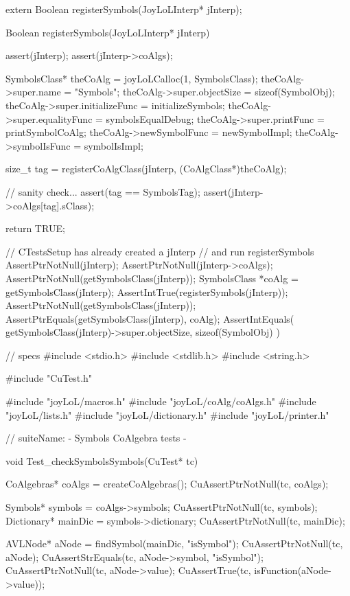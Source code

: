 \startCHeader
extern Boolean registerSymbols(JoyLoLInterp* jInterp);
\stopCHeader
{}

\startCCode
Boolean registerSymbols(JoyLoLInterp* jInterp) {
  assert(jInterp);
  assert(jInterp->coAlgs);
  
  SymbolsClass* theCoAlg = joyLoLCalloc(1, SymbolsClass);
  theCoAlg->super.name           = "Symbols";
  theCoAlg->super.objectSize     = sizeof(SymbolObj);
  theCoAlg->super.initializeFunc = initializeSymbols;
  theCoAlg->super.equalityFunc   = symbolsEqualDebug;
  theCoAlg->super.printFunc      = printSymbolCoAlg;
  theCoAlg->newSymbolFunc        = newSymbolImpl;
  theCoAlg->symbolIsFunc         = symbolIsImpl;

  size_t tag =
    registerCoAlgClass(jInterp, (CoAlgClass*)theCoAlg);
  
  // sanity check...
  assert(tag == SymbolsTag);
  assert(jInterp->coAlgs[tag].sClass);

  return TRUE;
}
\stopCCode


\startCTest
  // CTestsSetup has already created a jInterp
  // and run registerSymbols
  AssertPtrNotNull(jInterp);
  AssertPtrNotNull(jInterp->coAlgs);
  AssertPtrNotNull(getSymbolsClass(jInterp));
  SymbolsClass *coAlg = getSymbolsClass(jInterp);
  AssertIntTrue(registerSymbols(jInterp));
  AssertPtrNotNull(getSymbolsClass(jInterp));
  AssertPtrEquals(getSymbolsClass(jInterp), coAlg);
  AssertIntEquals(
    getSymbolsClass(jInterp)->super.objectSize,
    sizeof(SymbolObj)
  )
\stopCTest
\stopTestCase
\stopTestSuite


\starttyping
// specs
#include <stdio.h>
#include <stdlib.h>
#include <string.h>

#include "CuTest.h"

#include "joyLoL/macros.h"
#include "joyLoL/coAlg/coAlgs.h"
#include "joyLoL/lists.h"
#include "joyLoL/dictionary.h"
#include "joyLoL/printer.h"

// suiteName: - Symbols CoAlgebra tests -

void Test_checkSymbolsSymbols(CuTest* tc) {
  CoAlgebras* coAlgs = createCoAlgebras();
  CuAssertPtrNotNull(tc, coAlgs);

  Symbols* symbols = coAlgs->symbols;
  CuAssertPtrNotNull(tc, symbols);
  Dictionary* mainDic = symbols->dictionary;
  CuAssertPtrNotNull(tc, mainDic);

  AVLNode* aNode = findSymbol(mainDic, "isSymbol");
  CuAssertPtrNotNull(tc, aNode);
  CuAssertStrEquals(tc, aNode->symbol, "isSymbol");
  CuAssertPtrNotNull(tc, aNode->value);
  CuAssertTrue(tc, isFunction(aNode->value));
}
\stoptyping